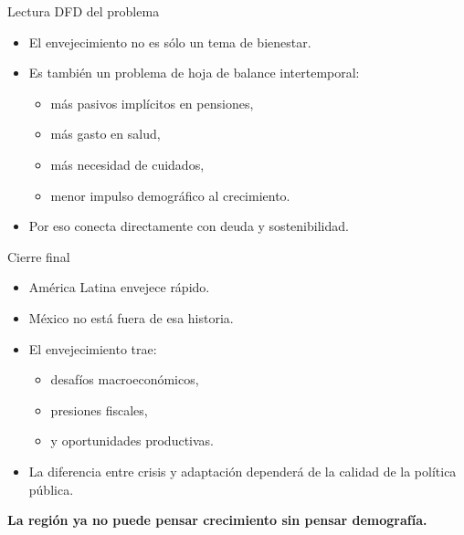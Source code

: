 \documentclass{beamer}
\begin{document}
\begin{frame}{Lectura DFD del problema}
\begin{itemize}
    \item El envejecimiento no es sólo un tema de bienestar.
    \item Es también un problema de hoja de balance intertemporal:
    \begin{itemize}
        \item más pasivos implícitos en pensiones,
        \item más gasto en salud,
        \item más necesidad de cuidados,
        \item menor impulso demográfico al crecimiento.
    \end{itemize}
    \item Por eso conecta directamente con deuda y sostenibilidad.
\end{itemize}
\end{frame}

\begin{frame}{Cierre final}
\begin{itemize}
    \item América Latina envejece rápido.
    \item México no está fuera de esa historia.
    \item El envejecimiento trae:
    \begin{itemize}
        \item desafíos macroeconómicos,
        \item presiones fiscales,
        \item y oportunidades productivas.
    \end{itemize}
    \item La diferencia entre crisis y adaptación dependerá de la calidad de la política pública.
\end{itemize}

\vspace{0.5cm}
\centering
\Large
\textbf{La región ya no puede pensar crecimiento sin pensar demografía.}
\end{frame}
\end{document}
